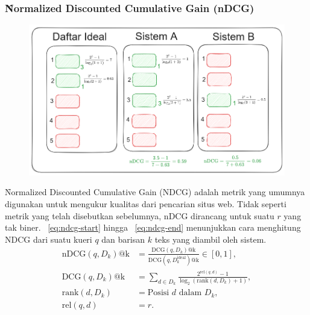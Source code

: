     \subsubsection{\f{Normalized Discounted Cumulative Gain} (nDCG)}

        \begin{figure}
            \centering
            \includegraphics[width=1\textwidth]{assets/pics/contohnDCG.png}
            \label{fig:ndcg}
        \end{figure}
        \f{Normalized Discounted Cumulative Gain} (NDCG) adalah metrik yang umumnya digunakan untuk mengukur kualitas dari pencarian situs web. Tidak seperti metrik yang telah disebutkan sebelumnya, nDCG dirancang untuk suatu $r$ yang tak biner. \equ~\ref{eq:ndcg-start} hingga \equ~\ref{eq:ndcg-end} menunjukkan cara menghitung NDCG dari suatu kueri $q$ dan barisan $k$ teks yang diambil oleh sistem.
        \begin{align}
            \label{eq:ndcg-start}
            \text{nDCG}(q, D_k)\text{@k} &= \frac{\text{DCG}(q, D_k)\text{@k}}{\text{DCG}(q, D_k^{\text{ideal}})\text{@k}} \in [0, 1], \\
            \label{eq:dcg}
            \text{DCG}(q, D_k)\text{@k} &= \sum_{d \in D_k} \frac{2^{\text{rel}(q, d)} - 1}{\log_2(\text{rank}(d, D_k) + 1)}, \\
            \text{rank}(d,D_k) &= \text{Posisi } d \text{ dalam } D_k, \\
            \text{rel}(q, d) &= r.
            \label{eq:ndcg-end}
        \end{align}

